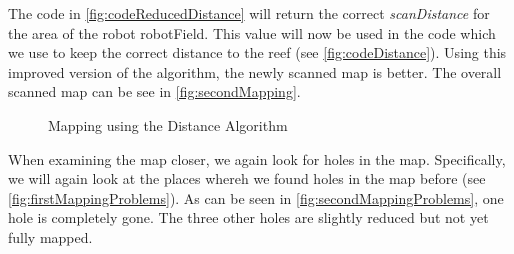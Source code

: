 \documentclass[twoside, 12pt]{article}
\begin{document}
\begin{figure}
\vspace{-50pt}
\end{figure}

The code in \autoref{fig:codeReducedDistance} will return the correct \textit{scanDistance} for the area of the robot robotField. This value will now be used in the code which we use to keep the correct distance to the reef (see \autoref{fig:codeDistance}). Using this improved version of the algorithm, the newly scanned map is better. The overall scanned map can be see in \autoref{fig:secondMapping}.\\

\begin{figure}
\vspace{0pt}
  \begin{center}
  \end{center}
\vspace{-20pt}
  \caption{Mapping using the Distance Algorithm}
  \label{fig:secondMapping}
\vspace{20pt}
\end{figure}

\begin{figure}
\vspace{-50pt}
\end{figure}

When examining the map closer, we again look for holes in the map. Specifically, we will again look at the places whereh we found holes in the map before (see \autoref{fig:firstMappingProblems}). As can be seen in \autoref{fig:secondMappingProblems}, one hole is completely gone. The three other holes are slightly reduced but not yet fully mapped.\\
\end{document}
